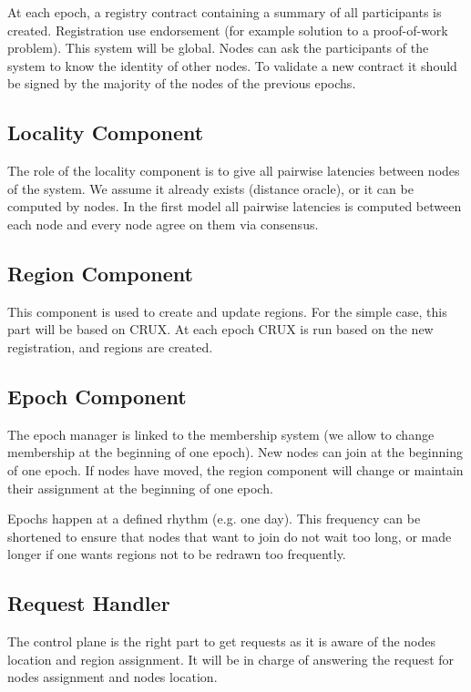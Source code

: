 \documentclass[a4paper,11pt,oneside]{report}
\begin{document}
At each epoch, a registry contract containing a summary of all participants is
created. Registration use endorsement (for example solution to a proof-of-work
problem).  This system will be global. Nodes can ask the participants of the
system to know the identity of other nodes. To validate a new contract  it
should be signed by the majority of the nodes of the previous epochs.

\subsection{Locality Component}

 The role of the locality component is to give all pairwise latencies between
 nodes of the system. We assume it already exists (distance oracle), or it can
 be computed by nodes. In the first model all pairwise latencies is computed
 between each node and every node agree on them via consensus. 
 
 \subsection{Region Component} This component is used to create and update
 regions. For the simple case, this part will be based on CRUX. At each epoch
 CRUX is run based on the new registration, and regions are created.
 
 \subsection{Epoch Component} The epoch manager is linked to the membership
 system (we allow to change membership at the beginning of one epoch). New
 nodes can join at the beginning of one epoch. If nodes have moved, the region
 component will change or maintain their assignment at the beginning of one
 epoch. 

Epochs happen at a defined rhythm (e.g. one day). This frequency can be
shortened to ensure that nodes that want to join do not wait too long, or made
longer if one wants regions not to be redrawn too frequently. 

\subsection{Request Handler} The control plane is the right part to get
requests as it is aware of the nodes location and region assignment. It will be
in charge of answering the request for nodes assignment and nodes location. 
\end{document}
